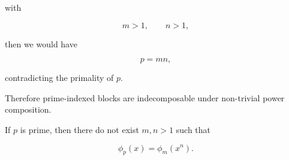 with

\[
m>1,
\qquad
n>1,
\]

then we would have

\[
p=mn,
\]

contradicting the primality of \(p\).

Therefore prime-indexed blocks are indecomposable under non-trivial
power composition.

\begin{proposition}

If \(p\) is prime, then there do not exist \(m,n>1\) such that

\[
\phi_p(x)=\phi_m(x^n).
\]

\end{proposition}


